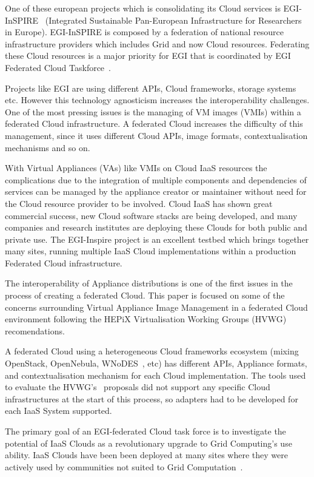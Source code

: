 \documentclass{cai}
\begin{document}
One of these european projects which is consolidating its Cloud services is EGI-InSPIRE~\cite{egi} (Integrated Sustainable Pan-European Infrastructure for Researchers in Europe). EGI-InSPIRE is composed by a federation of national resource infrastructure providers which includes Grid and now Cloud resources. 
Federating these Cloud resources is a major priority for EGI that is coordinated by EGI Federated Cloud Taskforce~\cite{fedCloud}.

Projects like EGI are using different APIs, Cloud frameworks, storage systems etc. 
However this technology agnosticism increases the interoperability challenges. One of the most pressing issues is the managing of VM images (VMIs) within a federated Cloud infrastructure.
A federated Cloud increases the difficulty of this management, since it uses different Cloud APIs, image formats, contextualisation mechanisms and so on. 

With Virtual Appliances (VAs) like VMIs on Cloud IaaS resources the complications due to the integration of multiple components and dependencies of services can be managed by the appliance creator or maintainer without need for the Cloud resource provider to be involved. 
Cloud IaaS has shown great commercial success, new Cloud software stacks are being developed, and many companies and research institutes are deploying these Clouds for both public and private use. 
The EGI-Inspire project is an excellent testbed which brings together many sites, running multiple IaaS Cloud implementations within a production Federated Cloud infrastructure.

The interoperability of Appliance distributions is one of the first issues in the process of creating a federated Cloud. This paper is focused on some of the concerns surrounding Virtual Appliance Image Management in a federated Cloud environment following the HEPiX Virtualisation Working Groups (HVWG)~\cite{hepix} recomendations.

A federated Cloud using a heterogeneous Cloud frameworks ecosystem (mixing OpenStack, OpenNebula, WNoDES~\cite{wnodes}, etc) has different APIs, Appliance formats, and contextualisation mechanism for each Cloud implementation. 
The tools used to evaluate the HVWG's~\cite{hepix} proposals did not support any specific Cloud infrastructures at the start of this process, so adapters had to be developed for each IaaS System supported. 

The primary goal of an EGI-federated Cloud task force is to investigate the potential of IaaS Clouds as a revolutionary upgrade to Grid Computing's use ability. 
IaaS Clouds have been been deployed at many sites where they were actively used by communities not suited to Grid Computation~\cite{gridCloud}. 
\end{document}
